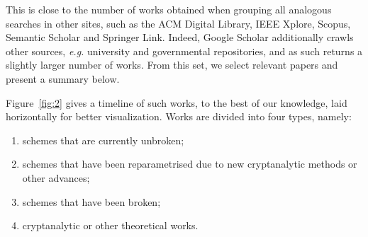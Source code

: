 \documentclass[openright]{report}
\begin{document}
This is close to the number of works obtained when grouping all analogous searches in other sites, such as the ACM Digital Library, IEEE Xplore, Scopus, Semantic Scholar and Springer Link. Indeed, Google Scholar additionally crawls other sources, \emph{e.g.} university and governmental repositories, and as such returns a slightly larger number of works. From this set, we select relevant papers and present a summary below.

Figure~\ref{fig:2} gives a timeline of such works, to the best of our knowledge, laid horizontally for better visualization. Works are divided into four types, namely:

\begin{enumerate}[label=(\roman*), itemsep=1pt]
  \item\label{enum:i} schemes that are currently unbroken;
  \item\label{enum:ii} schemes that have been reparametrised due to new cryptanalytic methods or other advances;
  \item\label{enum:iii} schemes that have been broken;
  \item\label{enum:iv} cryptanalytic or other theoretical works.
\end{enumerate}
\end{document}
